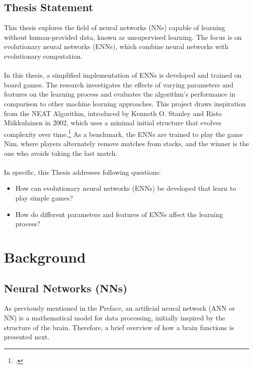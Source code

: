 \documentclass[11pt]{report}
\begin{document}
    \section{Thesis Statement}\label{sec:thesis-statement}
    This thesis explores the field of neural networks (NNs) capable of learning without human-provided data, known as unsupervised learning.
    The focus is on evolutionary neural networks (ENNs), which combine neural networks with evolutionary computation.
    \\ \\
    In this thesis, a simplified implementation of ENNs is developed and trained on board games.
    The research investigates the effects of varying parameters and features on the learning process and evaluates the algorithm’s performance in comparison to other machine learning approaches.
    This project draws inspiration from the NEAT Algorithm, introduced by Kenneth O. Stanley and Risto Miikkulainen in 2002, which uses a minimal initial structure that evolves complexity over time.\footcite[p.105-106]{Neat_02}
    As a benchmark, the ENNs are trained to play the game Nim, where players alternately remove matches from stacks, and the winner is the one who avoids taking the last match.
    \\ \\
    In specific, this Thesis addresses following questions:
    \begin{itemize}
        \item How can evolutionary neural networks (ENNs) be developed that learn to play simple games?
        \item How do different parameters and features of ENNs affect the learning process?
    \end{itemize}


    \chapter{Background}\label{ch:background}


    \section{Neural Networks (NNs)}\label{sec:neural-networks-(nns)}

    As previously mentioned in the Preface, an artificial neural network (ANN or NN) is a mathematical model for data processing, initially inspired by the structure of the brain.
    Therefore, a brief overview of how a brain functions is presented next.
\end{document}
